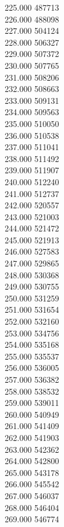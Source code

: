 { 225.000	487713 \\
 226.000	488098 \\
 227.000	504124 \\
 228.000	506327 \\
 229.000	507372 \\
 230.000	507765 \\
 231.000	508206 \\
 232.000	508663 \\
 233.000	509131 \\
 234.000	509563 \\
 235.000	510050 \\
 236.000	510538 \\
 237.000	511041 \\
 238.000	511492 \\
 239.000	511907 \\
 240.000	512240 \\
 241.000	512737 \\
 242.000	520557 \\
 243.000	521003 \\
 244.000	521472 \\
 245.000	521913 \\
 246.000	527583 \\
 247.000	529865 \\
 248.000	530368 \\
 249.000	530755 \\
 250.000	531259 \\
 251.000	531654 \\
 252.000	532160 \\
 253.000	534756 \\
 254.000	535168 \\
 255.000	535537 \\
 256.000	536005 \\
 257.000	536382 \\
 258.000	538532 \\
 259.000	539011 \\
 260.000	540949 \\
 261.000	541409 \\
 262.000	541903 \\
 263.000	542362 \\
 264.000	542800 \\
 265.000	543178 \\
 266.000	545542 \\
 267.000	546037 \\
 268.000	546404 \\
 269.000	546774 \\
}
